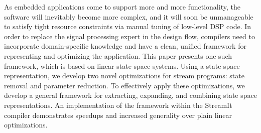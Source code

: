\label{sec:conclusion}

As embedded applications come to support more and more functionality,
the software will inevitably become more complex, and it will soon be
unmanageable to satisfy tight resource constraints via manual tuning
of low-level DSP code.  In order to replace the signal processing
expert in the design flow, compilers need to incorporate
domain-specific knowledge and have a clean, unified framework for
representing and optimizing the application.  This paper presents one
such framework, which is based on linear state space systems.  Using a
state space representation, we develop two novel optimizations for
stream programs: state removal and parameter reduction.  To
effectively apply these optimizations, we develop a general framework
for extracting, expanding, and combining state space representations.
An implementation of the framework within the StreamIt compiler
demonstrates speedups and increased generality over plain linear
optimizations.





